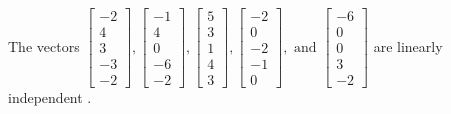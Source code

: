 \begin{exercise}
\begin{exerciseStatement}
  \end{exerciseStatement}
  \begin{exerciseAnswer}
   The vectors \(\left[\begin{array}{r}
-2 \\
4 \\
3 \\
-3 \\
-2
\end{array}\right] , \left[\begin{array}{r}
-1 \\
4 \\
0 \\
-6 \\
-2
\end{array}\right] , \left[\begin{array}{r}
5 \\
3 \\
1 \\
4 \\
3
\end{array}\right] , \left[\begin{array}{r}
-2 \\
0 \\
-2 \\
-1 \\
0
\end{array}\right] , \text{ and } \left[\begin{array}{r}
-6 \\
0 \\
0 \\
3 \\
-2
\end{array}\right]\) are 
  	 linearly independent  .
  


  \end{exerciseAnswer}
\end{exercise}